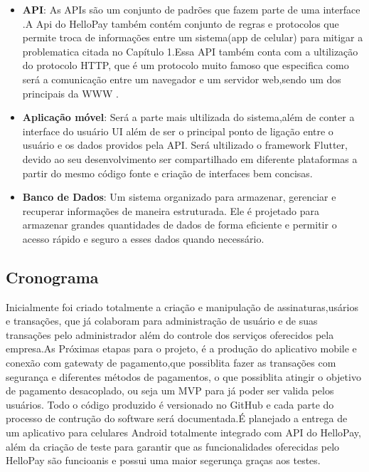 \documentclass[a4paper,12pt]{article}
\begin{document}
\begin{itemize}
    \item \textbf{API}: As APIs são um conjunto de padrões que fazem parte de uma interface \cite{api}.A Api do HelloPay também contém conjunto de regras e protocolos que permite troca de informações entre um sistema(app de celular) para mitigar a problematica citada no Capítulo 1.Essa \ac{API} também conta com a ultilização do protocolo \ac{HTTP}, que é um protocolo muito famoso que especifica como será a comunicação entre um navegador e um servidor web,sendo um dos principais da \ac{WWW}  \cite{http}.
    \item \textbf{Aplicação móvel}: Será a parte mais ultilizada do sistema,além de conter a interface do usuário \ac{UI} além de ser o principal ponto de ligação entre o usuário e os dados providos pela \ac{API}. Será ultilizado o framework Flutter, devido ao seu desenvolvimento ser compartilhado em diferente plataformas a partir do mesmo código fonte e criação de interfaces bem concisas.
    \item \textbf{Banco de Dados}: Um sistema organizado para armazenar, gerenciar e recuperar informações de maneira estruturada. Ele é projetado para armazenar grandes quantidades de dados de forma eficiente e permitir o acesso rápido e seguro a esses dados quando necessário.
\end{itemize}
\subsection{Cronograma}
\hspace{0.5cm}Inicialmente foi criado totalmente a criação e manipulação de assinaturas,usários e transações, que já colaboram para administração de usuário e de suas transações pelo administrador além do controle dos serviços oferecidos pela empresa.As Próximas etapas para o projeto, é a produção do aplicativo mobile e conexão com gatewaty de pagamento,que possiblita fazer as transações com segurança e diferentes métodos de pagamentos, o que possiblita atingir o objetivo de pagamento desacoplado, ou seja um \ac{MVP} para já poder ser valida pelos usuários.
\newline Todo o código produzido é versionado no GitHub e cada parte do processo de contrução do software será documentada.É planejado a entrega de um aplicativo para celulares Android totalmente integrado com \ac{API} do HelloPay, além da criação de teste para garantir que as funcionalidades oferecidas pelo HelloPay são funcioanis e possui uma maior segerunça graças aos testes.
\end{document}
